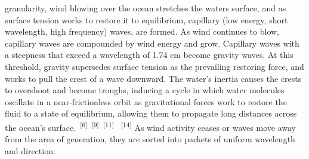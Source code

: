 \documentclass{article}
\begin{document}
\newpage
{}
\fancyfoot[C]{\thepage} 
\thispagestyle{fancy}
\noindent
\begin{minipage}[t]{0.45\textwidth}
    \par{\noindent granularity, wind blowing over the ocean stretches the waters surface, and as surface tension works to restore it to equilibrium, capillary (low energy, short wavelength, high frequency) waves, are formed. As wind continues to blow, capillary waves are compounded by wind energy and grow. Capillary waves with a steepness that exceed a wavelength of 1.74 cm become gravity waves. At this threshold, gravity supersedes surface tension as the prevailing restoring force, and works to pull the crest of a wave downward. The water's inertia causes the crests to overshoot and become troughs, inducing a cycle in which water molecules oscillate in a near-frictionless orbit as gravitational forces work to restore the fluid to a state of equilibrium, allowing them to propagate long distances across the ocean's surface.~\textsuperscript{[6]}~\textsuperscript{[9]}~\textsuperscript{[11]} ~\textsuperscript{[14]} As wind activity ceases or waves move away from the area of generation, they are sorted into packets of uniform wavelength and direction.}
\end{minipage}
\hspace{.05\textwidth}
\noindent
\end{document}
